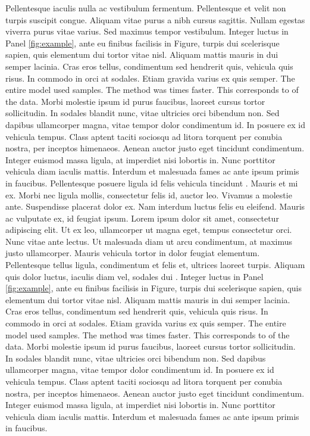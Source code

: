  Pellentesque iaculis nulla ac vestibulum fermentum. Pellentesque et velit non turpis suscipit congue. Aliquam vitae purus a nibh cursus sagittis. Nullam egestas viverra purus vitae varius. Sed maximus tempor vestibulum. Integer luctus in Panel \ref{fig:example}, ante eu finibus facilisis in Figure, turpis dui scelerisque sapien, quis elementum dui tortor vitae nisl. Aliquam mattis mauris in dui semper lacinia. Cras eros tellus, condimentum sed hendrerit quis, vehicula quis risus. In commodo in orci at sodales. Etiam gravida varius ex quis semper. The entire model used samples. The method was times faster. This corresponds to of the data. Morbi molestie ipsum id purus faucibus, laoreet cursus tortor sollicitudin. In sodales blandit nunc, vitae ultricies orci bibendum non. Sed dapibus ullamcorper magna, vitae tempor dolor condimentum id. In posuere ex id vehicula tempus. Class aptent taciti sociosqu ad litora torquent per conubia nostra, per inceptos himenaeos. Aenean auctor justo eget tincidunt condimentum. Integer euismod massa ligula, at imperdiet nisi lobortis in. Nunc porttitor vehicula diam iaculis mattis. Interdum et malesuada fames ac ante ipsum primis in faucibus.
Pellentesque posuere ligula id felis vehicula tincidunt \parencite{giampietroEstimatingStochasticDiscount2018}. Mauris et mi ex. Morbi nec ligula mollis, consectetur felis id, auctor leo. Vivamus a molestie ante. Suspendisse placerat dolor ex. Nam interdum luctus felis eu eleifend. Mauris ac vulputate ex, id feugiat ipsum. Lorem ipsum dolor sit amet, consectetur adipiscing elit. Ut ex leo, ullamcorper ut magna eget, tempus consectetur orci. Nunc vitae ante lectus. Ut malesuada diam ut arcu condimentum, at maximus justo ullamcorper. Mauris vehicula tortor in dolor feugiat elementum. Pellentesque tellus ligula, condimentum et felis et, ultrices laoreet turpis. Aliquam quis dolor luctus, iaculis diam vel, sodales dui \parencite{guidolin_forecasting_2021}. Integer luctus in Panel \ref{fig:example}, ante eu finibus facilisis in Figure, turpis dui scelerisque sapien, quis elementum dui tortor vitae nisl. Aliquam mattis mauris in dui semper lacinia. Cras eros tellus, condimentum sed hendrerit quis, vehicula quis risus. In commodo in orci at sodales. Etiam gravida varius ex quis semper. The entire model used samples. The method was times faster. This corresponds to of the data. Morbi molestie ipsum id purus faucibus, laoreet cursus tortor sollicitudin. In sodales blandit nunc, vitae ultricies orci bibendum non. Sed dapibus ullamcorper magna, vitae tempor dolor condimentum id. In posuere ex id vehicula tempus. Class aptent taciti sociosqu ad litora torquent per conubia nostra, per inceptos himenaeos. Aenean auctor justo eget tincidunt condimentum. Integer euismod massa ligula, at imperdiet nisi lobortis in. Nunc porttitor vehicula diam iaculis mattis. Interdum et malesuada fames ac ante ipsum primis in faucibus.
